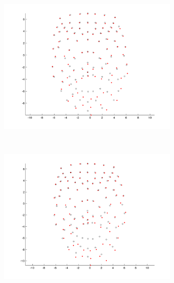 \documentclass[11pt]{report}
\begin{document}
\begin{figure}[htbp!]
        \centering
        \begin{subfigure}[b]{0.3\textwidth}
                \includegraphics[trim = 10mm 0mm 10mm 0mm,clip,width=\textwidth]{img/weights/3D/19blends/w2_frame200_blends19.png}
        \end{subfigure}%
        ~ %
        \begin{subfigure}[b]{0.3\textwidth}
                \includegraphics[trim = 10mm 0mm 10mm 0mm,clip,width=\textwidth]{img/weights/3D/19blends/w2_frame400_blends19.png}
        \end{subfigure}

\end{figure}
\end{document}
